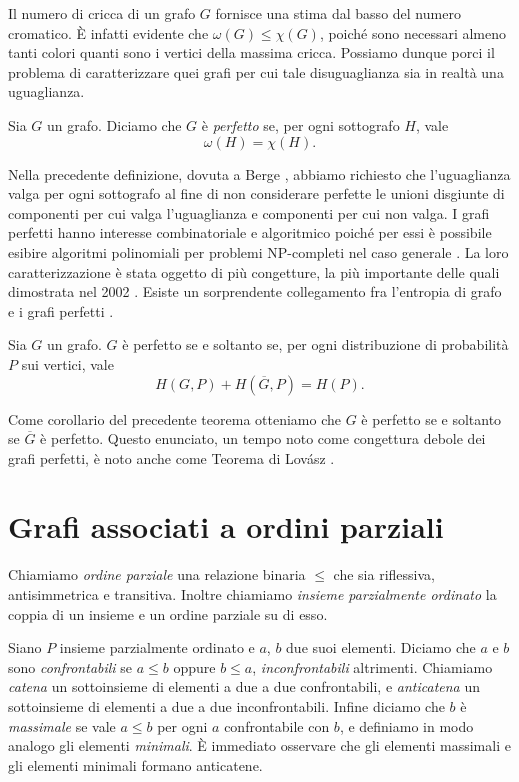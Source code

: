 Il numero di cricca di un grafo \(G\) fornisce una stima dal basso del numero cromatico. È infatti evidente che \(\omega(G)\le\chi(G)\), poiché sono necessari almeno tanti colori quanti sono i vertici della massima cricca. Possiamo dunque porci il problema di caratterizzare quei grafi per cui tale disuguaglianza sia in realtà una uguaglianza. 
\begin{definition}
	Sia \(G\) un grafo. Diciamo che \(G\) è \emph{perfetto} se, per ogni sottografo \(H\), vale
	\[\omega(H)=\chi(H).\]
\end{definition}
Nella precedente definizione, dovuta a Berge \cite{Berge1960}, abbiamo richiesto che l'uguaglianza valga per ogni sottografo al fine di non considerare perfette le unioni disgiunte di componenti per cui valga l'uguaglianza e componenti per cui non valga. I grafi perfetti hanno interesse combinatoriale e algoritmico poiché per essi è possibile esibire algoritmi polinomiali per problemi NP-completi nel caso generale \cite{Golumbic2004}. La loro caratterizzazione è stata oggetto di più congetture, la più importante delle quali dimostrata nel 2002 \cite{Chudnovsky2006}. Esiste un sorprendente collegamento fra l'entropia di grafo e i grafi perfetti \cite{Csiszar1990}. 
\begin{theorem}
	 \label{lovasztheorem} Sia \(G\) un grafo. \(G\) è perfetto se e soltanto se, per ogni distribuzione di probabilità \(P\) sui vertici, vale
	\[H\left(G,P\right)+H\left(\overline{G},P\right)=H(P).\]
\end{theorem}
Come corollario del precedente teorema otteniamo che \(G\) è perfetto se e soltanto se \(\overline{G}\) è perfetto. Questo enunciato, un tempo noto come congettura debole dei grafi perfetti, è noto anche come Teorema di Lovász \cite{Lovasz1972}.

\section{Grafi associati a ordini parziali}

\begin{definition}
  Chiamiamo \emph{ordine parziale} una relazione binaria \(\le\) che sia riflessiva, antisimmetrica e transitiva. Inoltre chiamiamo \emph{insieme parzialmente ordinato} la coppia di un insieme e un ordine parziale su di esso.
\end{definition}

Siano \(P\) insieme parzialmente ordinato e \(a\), \(b\) due suoi elementi. Diciamo che \(a\) e \(b\) sono \emph{confrontabili} se \(a\le b\) oppure \(b\le a\), \emph{inconfrontabili} altrimenti. Chiamiamo \emph{catena} un sottoinsieme di elementi a due a due confrontabili, e \emph{anticatena} un sottoinsieme di elementi a due a due inconfrontabili. Infine diciamo che \(b\) è \emph{massimale} se vale \(a\le b\) per ogni \(a\) confrontabile con \(b\), e definiamo in modo analogo gli elementi \emph{minimali}. È immediato osservare che gli elementi massimali e gli elementi minimali formano anticatene.

